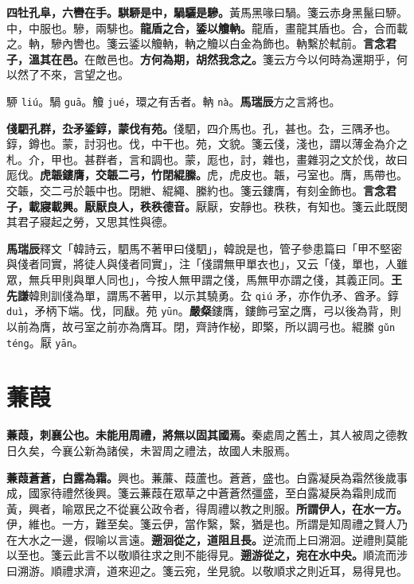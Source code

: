 \textbf{四牡孔阜，六轡在手。騏駵是中，騧驪是驂。}{\footnotesize 黃馬黑喙曰騧。箋云赤身黑鬣曰駵。中，中服也。驂，兩騑也。}\textbf{龍盾之合，鋈以觼軜。}{\footnotesize 龍盾，畫龍其盾也。合，合而載之。軜，驂內轡也。箋云鋈以觼軜，軜之觼以白金為飾也。軜繫於軾前。}\textbf{言念君子，溫其在邑。}{\footnotesize 在敵邑也。}\textbf{方何為期，胡然我念之。}{\footnotesize 箋云方今以何時為還期乎，何以然了不來，言望之也。}

\begin{quoting}駵 \texttt{liú}。騧 \texttt{guā}。觼 \texttt{jué}，環之有舌者。軜 \texttt{nà}。\textbf{馬瑞辰}方之言將也。\end{quoting}

\textbf{俴駟孔群，厹矛鋈錞，蒙伐有苑。}{\footnotesize 俴駟，四介馬也。孔，甚也。厹，三隅矛也。錞，鐏也。蒙，討羽也。伐，中干也。苑，文貌。箋云俴，淺也，謂以薄金為介之札。介，甲也。甚群者，言和調也。蒙，厖也，討，雜也，畫雜羽之文於伐，故曰厖伐。}\textbf{虎韔鏤膺，交韔二弓，竹閉緄縢。}{\footnotesize 虎，虎皮也。韔，弓室也。膺，馬帶也。交韔，交二弓於韔中也。閉紲、緄繩、縢約也。箋云鏤膺，有刻金飾也。}\textbf{言念君子，載寢載興。厭厭良人，秩秩德音。}{\footnotesize 厭厭，安靜也。秩秩，有知也。箋云此既閔其君子寢起之勞，又思其性與德。}

\begin{quoting}\textbf{馬瑞辰}釋文「韓詩云，駟馬不著甲曰俴駟」，韓說是也，管子參患篇曰「甲不堅密與俴者同實，將徒人與俴者同實」，注「俴謂無甲單衣也」，又云「俴，單也，人雖眾，無兵甲則與單人同也」，今按人無甲謂之俴，馬無甲亦謂之俴，其義正同。\textbf{王先謙}韓則訓俴為單，謂馬不著甲，以示其驍勇。厹 \texttt{qiú} 矛，亦作仇矛、酋矛。錞 \texttt{duì}，矛柄下端。伐，同瞂。苑 \texttt{yūn}。\textbf{嚴粲}鏤膺，鏤飾弓室之膺，弓以後為背，則以前為膺，故弓室之前亦為膺耳。閉，齊詩作柲，即檠，所以調弓也。緄縢 \texttt{gǔn téng}。厭 \texttt{yān}。\end{quoting}

\section{蒹葭}


\textbf{蒹葭，刺襄公也。未能用周禮，將無以固其國焉。}{\footnotesize 秦處周之舊土，其人被周之德教日久矣，今襄公新為諸侯，未習周之禮法，故國人未服焉。}

\textbf{蒹葭蒼蒼，白露為霜。}{\footnotesize 興也。蒹薕、葭蘆也。蒼蒼，盛也。白露凝戾為霜然後歲事成，國家待禮然後興。箋云蒹葭在眾草之中蒼蒼然彊盛，至白露凝戾為霜則成而黃，興者，喻眾民之不從襄公政令者，得周禮以教之則服。}\textbf{所謂伊人，在水一方。}{\footnotesize 伊，維也。一方，難至矣。箋云伊，當作繄，繄，猶是也。所謂是知周禮之賢人乃在大水之一邊，假喻以言遠。}\textbf{遡洄從之，道阻且長。}{\footnotesize 逆流而上曰溯洄。逆禮則莫能以至也。箋云此言不以敬順往求之則不能得見。}\textbf{遡游從之，宛在水中央。}{\footnotesize 順流而涉曰溯游。順禮求濟，道來迎之。箋云宛，坐見貌。以敬順求之則近耳，易得見也。}

